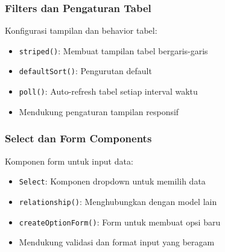 \documentclass[a4paper]{report}
\begin{document}
\subsubsection{Filters dan Pengaturan Tabel}
Konfigurasi tampilan dan behavior tabel:
\begin{itemize}
\item \texttt{striped()}: Membuat tampilan tabel bergaris-garis
\item \texttt{defaultSort()}: Pengurutan default
\item \texttt{poll()}: Auto-refresh tabel setiap interval waktu
\item Mendukung pengaturan tampilan responsif
\end{itemize}

\subsubsection{Select dan Form Components}
Komponen form untuk input data:
\begin{itemize}
\item \texttt{Select}: Komponen dropdown untuk memilih data
\item \texttt{relationship()}: Menghubungkan dengan model lain
\item \texttt{createOptionForm()}: Form untuk membuat opsi baru
\item Mendukung validasi dan format input yang beragam
\end{itemize}
\end{document}
